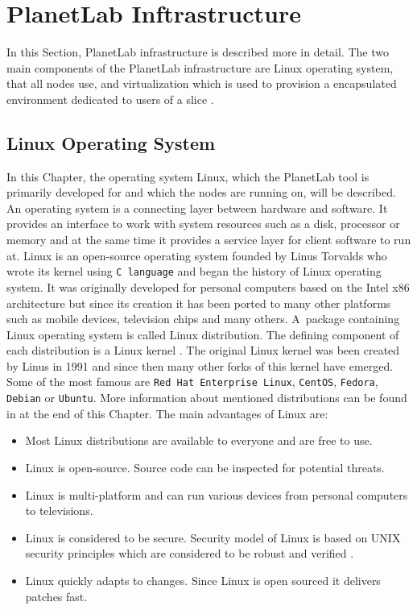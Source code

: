 \section{PlanetLab Inftrastructure}
\label{section:plinfra}
In this Section, PlanetLab infrastructure is described more in detail. The two main components of the PlanetLab infrastructure are Linux operating system, that all nodes use, and virtualization which is used to provision a encapsulated environment dedicated to users of a slice \cite{planetlabmain}.

\subsection{Linux Operating System}
\label{subsection:Linux}
In this Chapter, the operating system Linux, which the PlanetLab tool is primarily developed for and which the nodes are running on, will be described. An operating system is a connecting layer between hardware and software. It provides an interface to work with system resources such as a disk, processor or memory and at the same time it provides a service layer for client software to run at. Linux is an open-source operating system founded by Linus Torvalds who wrote its kernel using \texttt{C language} and began the history of Linux operating system. It was originally developed for personal computers based on the Intel x86 architecture but since its creation it has been ported to many other platforms such as mobile devices, television chips and many others. A~package containing Linux operating system is called Linux distribution. The defining component of each distribution is a Linux kernel \cite{eckert2012linux+}. The original Linux kernel was been created by Linus in 1991 \cite{linuxintro} and since then many other forks of this kernel have emerged. Some of the most famous are \texttt{Red Hat Enterprise Linux},  \texttt{CentOS}, \texttt{Fedora}, \texttt{Debian} or \texttt{Ubuntu}. More information about mentioned distributions can be found in at the end of this Chapter. The main advantages of Linux are:
\begin{itemize}
	\item Most Linux distributions are available to everyone and are free to use.
	\item Linux is open-source. Source code can be inspected for potential threats.
	\item Linux is multi-platform and can run various devices from personal computers to televisions.
	\item Linux is considered to be secure. Security model of Linux is based on UNIX security principles which are considered to be robust and verified \cite{BILHEQP2xqVnjbQi}. 
	\item Linux quickly adapts to changes. Since Linux is open sourced it delivers patches fast.
\end{itemize}
